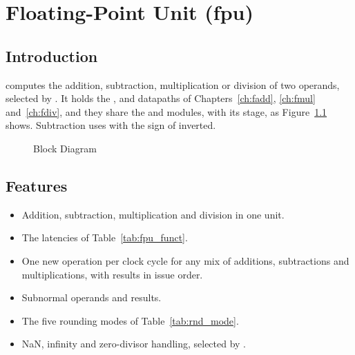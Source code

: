 \chapter{Floating-Point Unit (fpu)}
\label{ch:fpu}

\section{Introduction}

 computes the addition, subtraction, multiplication or division of two
operands, selected by . It holds the ,  and 
datapaths of Chapters~\ref{ch:fadd}, \ref{ch:fmul} and~\ref{ch:fdiv}, and they
share the  and  modules,  with its  stage, as
Figure~\ref{fig:fpu} shows. Subtraction uses  with the sign of
 inverted.

\begin{figure}[H]
\centering
{}
\caption{ Block Diagram}
\label{fig:fpu}
\end{figure}

\section{Features}

\begin{itemize}
\item Addition, subtraction, multiplication and division in one unit.
\item The latencies of Table~\ref{tab:fpu_funct}.
\item One new operation per clock cycle for any mix of additions, subtractions
  and multiplications, with results in issue order.
\item Subnormal operands and results.
\item The five rounding modes of Table~\ref{tab:rnd_mode}.
\item NaN, infinity and zero-divisor handling, selected by .
\end{itemize}

